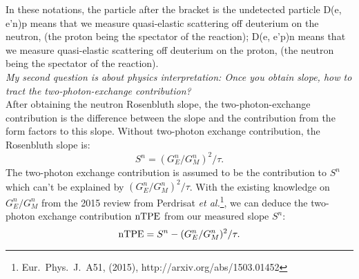 \documentclass[11pt]{article}
\begin{document}
In these notations, the particle after the bracket is the undetected particle
D(e, e'n)p means that we measure quasi-elastic scattering off deuterium on the neutron, (the proton being the spectator of the reaction);
D(e, e'p)n  means that we measure quasi-elastic scattering off deuterium on the proton, (the neutron being the spectator of the reaction).\\

{\em My second question is about physics interpretation:  Once you obtain slope, how to tract the two-photon-exchange contribution?}\\

After obtaining the neutron Rosenbluth slope, the two-photon-exchange contribution is the difference between the slope and the contribution from the form factors to this slope. Without two-photon exchange contribution, the Rosenbluth slope is:
\begin{equation}
  S^n = (G_E^n/G_M^n)^2/\tau.
\end{equation}
The two-photon exchange contribution is assumed to be the contribution to $S^n$ which can't be explained by $(G_E^n/G_M^n)^2/\tau$.
With the existing knowledge on $G_E^n/G_M^n$ from the 2015 review from Perdrisat {\it et al.}\footnote{Eur.~Phys.~J.~A51, (2015), http://arxiv.org/abs/1503.01452}, we can deduce the two-photon exchange contribution ${\rm nTPE}$ from our measured slope $S^n$:
\begin{equation}
  {\rm nTPE} = S^n - (G_E^n/G_M^n)^2/\tau.
\end{equation}
\end{document}
